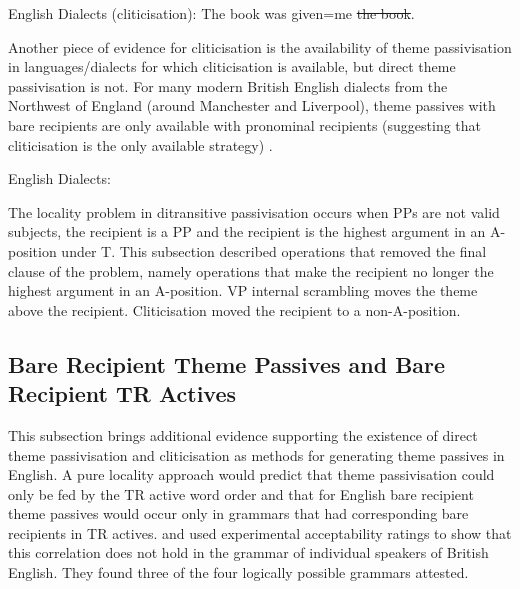 \begin{exe}
	\ex English Dialects (cliticisation): The book was given=me \sout{the book}.\label{ex:en-clitic}
\end{exe}

Another piece of evidence for cliticisation is the availability of theme passivisation in languages/dialects for which cliticisation is available, but direct theme passivisation is not. For many modern British English dialects from the Northwest of England (around Manchester and Liverpool), theme passives with bare recipients are only available with pronominal recipients (suggesting that cliticisation is the only available strategy) \citep{Haddican.2010,Myler.2011,Haddican.2012,Biggs.2015}.

\begin{exe}
	\ex English Dialects:\label{ex:endial-prosens}
	\begin{xlist}
	\end{xlist}
\end{exe}

The locality problem in ditransitive passivisation occurs when PPs are not valid subjects, the recipient is a PP and the recipient is the highest argument in an A-position under T. This subsection described operations that removed the final clause of the problem, namely operations that make the recipient no longer the highest argument in an A-position. VP internal scrambling moves the theme above the recipient. Cliticisation moved the recipient to a non-A-position.

\subsection{Bare Recipient Theme Passives and Bare Recipient TR Actives}
This subsection brings additional evidence supporting the existence of direct theme passivisation and cliticisation as methods for generating theme passives in English. A pure locality approach would predict that theme passivisation could only be fed by the TR active word order and that for English bare recipient theme passives would occur only in grammars that had corresponding bare recipients in TR actives. \cite{Haddican.2010} and \cite{Haddican.2011,Haddican.2012} used experimental acceptability ratings to show that this correlation does not hold in the grammar of individual speakers of British English. They found three of the four logically possible grammars attested. 

